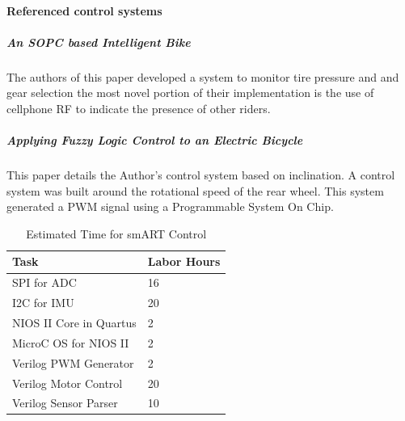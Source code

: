 \documentclass[12pt,article]{IEEEtran}
\begin{document}
    \paragraph{Referenced control systems}
        \subparagraph{An SOPC based Intelligent Bike}   
            The authors of this paper developed a system to monitor tire pressure and and gear selection
            the most novel portion of their implementation is the use of cellphone RF to indicate the
            presence of other riders. \cite{SOPCBike}
            
        \subparagraph{Applying Fuzzy Logic Control to an Electric Bicycle}
            This paper details the Author's control system based on inclination. A control system
            was built around the rotational speed of the rear wheel. This system generated a PWM
            signal using a Programmable System On Chip.\cite{FuzzyLogicControl}


            
    \begin{table}[H]        
        \renewcommand{\arraystretch}{1.3}
                \caption{Estimated Time for smART Control}
                
                \label{Estimated Time}
                
                \centering
                \begin{tabular}{p{5.5cm}|p{2cm}}
                \hline
                \bfseries   Task                        & \bfseries Labor Hours                         \\
                \hline\hline
                            SPI for ADC                 & 16                                            \\
                            I2C for IMU                 & 20                                            \\  
                            NIOS II Core in Quartus     & 2                                             \\  
                            MicroC OS for NIOS II       & 2                                             \\
                            Verilog PWM Generator       & 2                                             \\
                            Verilog Motor Control       & 20                                            \\  
                            Verilog Sensor Parser       & 10                                            \\  
                            \hline
                \end{tabular}
        \end{table}
\end{document}
